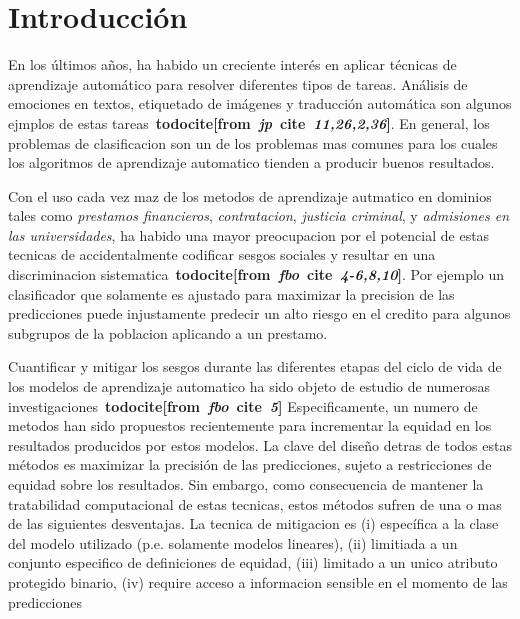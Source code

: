 \chapter*{Introducción}\label{chapter:introduction}

\newcommand{\todocite}[2]{\textbf{todocite[from~\textit{#1}~cite~\textit{#2}]}}



En los últimos años, ha habido un creciente interés en aplicar técnicas de aprendizaje automático para resolver diferentes tipos de tareas.
Análisis de emociones en textos, etiquetado de imágenes y traducción automática son algunos ejmplos de estas tareas~\todocite{jp}{11,26,2,36}.
En general, los problemas de clasificacion son un de los problemas mas comunes para los cuales los algoritmos de aprendizaje automatico tienden a producir buenos resultados.


Con el uso cada vez maz de los metodos de aprendizaje autmatico en dominios tales como \emph{prestamos financieros}, \emph{contratacion}, \emph{justicia criminal}, y \emph{admisiones en las universidades}, ha habido una mayor preocupacion por el potencial de estas tecnicas de accidentalmente codificar sesgos sociales y resultar en una discriminacion sistematica~\todocite{fbo}{4-6,8,10}.
Por ejemplo un clasificador que solamente es ajustado para maximizar la precision de las predicciones puede injustamente predecir un alto riesgo en el credito para algunos subgrupos de la poblacion aplicando a un prestamo.



Cuantificar y mitigar los sesgos durante las diferentes etapas del ciclo de vida de los modelos de aprendizaje automatico ha sido objeto de estudio de numerosas investigaciones~\todocite{fbo}{5}
Especificamente, un numero de metodos han sido propuestos recientemente para incrementar la equidad en los resultados producidos por estos modelos.
La clave del diseño detras de todos estas métodos es maximizar la precisión de las predicciones, sujeto a restricciones de equidad sobre los resultados.
Sin embargo, como consecuencia de mantener la tratabilidad computacional de estas tecnicas, estos métodos sufren de una o mas de las siguientes desventajas.
La tecnica de mitigacion es
(i) específica a la clase del modelo utilizado (p.e. solamente modelos lineares),
(ii) limitiada a un conjunto especifico de definiciones de equidad,
(iii) limitado a un unico atributo protegido binario,
(iv) require acceso a informacion sensible en el momento de las predicciones

